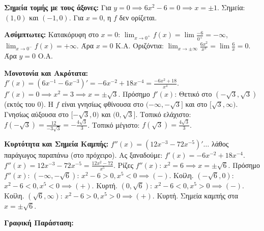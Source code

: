 \begin{thema}[label=\bf\large{ΘΕΜΑ \textcolor{black}{\arabic*}}]
\begin{alist}
    \item \textbf{Σημεία τομής με τους άξονες:}
    Για $y=0 \implies 6x^2-6=0 \implies x=\pm 1$. Σημεία: $(1,0)$ και $(-1,0)$.
    Για $x=0$, η $f$ δεν ορίζεται.

    \item \textbf{Ασύμπτωτες:}
    Κατακόρυφη στο $x=0$:
    $\lim_{x\to 0^+} f(x) = \lim \frac{-6}{0^+} = -\infty$, $\lim_{x\to 0^-} f(x) = +\infty$. Άρα $x=0$ Κ.Α.
    Οριζόντια:
    $\lim_{x\to \pm\infty} \frac{6x^2}{x^3} = \lim \frac{6}{x} = 0$. Άρα $y=0$ Ο.Α.

    \item \textbf{Μονοτονία και Ακρότατα:}
    $f'(x) = \left(6x^{-1} - 6x^{-3}\right)' = -6x^{-2} + 18x^{-4} = \frac{-6x^2+18}{x^4}$.
    $f'(x) = 0 \implies x^2=3 \implies x=\pm\sqrt{3}$.
    Πρόσημο $f'(x)$: Θετικό στο $(-\sqrt{3}, \sqrt{3})$ (εκτός του 0).
    Η $f$ είναι γνησίως φθίνουσα στο $(-\infty, -\sqrt{3}]$ και στο $[\sqrt{3}, \infty)$.
    Γνησίως αύξουσα στο $[-\sqrt{3}, 0)$ και $(0, \sqrt{3}]$.
    Τοπικό ελάχιστο: $f(-\sqrt{3}) = \frac{12}{-3\sqrt{3}} = -\frac{4\sqrt{3}}{3}$.
    Τοπικό μέγιστο: $f(\sqrt{3}) = \frac{4\sqrt{3}}{3}$.

    \item \textbf{Κυρτότητα και Σημεία Καμπής:}
    $f''(x) = (12x^{-3} - 72x^{-5})' \dots$ λάθος παράγωγος παραπάνω (στο πρόχειρο).
    Ας ξαναδούμε: $f'(x) = -6x^{-2} + 18x^{-4}$.
    $f''(x) = 12x^{-3} - 72x^{-5} = \frac{12x^2-72}{x^5}$.
    Ρίζες $f''(x)$: $x^2=6 \implies x=\pm\sqrt{6}$.
    Πρόσημο $f''(x)$:
    $(-\infty, -\sqrt{6})$: $x^2-6>0, x^5<0 \implies (-)$. Κοίλη.
    $(-\sqrt{6}, 0)$: $x^2-6<0, x^5<0 \implies (+)$. Κυρτή.
    $(0, \sqrt{6})$: $x^2-6<0, x^5>0 \implies (-)$. Κοίλη.
    $(\sqrt{6}, \infty)$: $x^2-6>0, x^5>0 \implies (+)$. Κυρτή.
    Σημεία καμπής στα $x=\pm\sqrt{6}$.

    \item \textbf{Γραφική Παράσταση:}
    \begin{center}
    \end{center}
\end{alist}


\end{thema}
